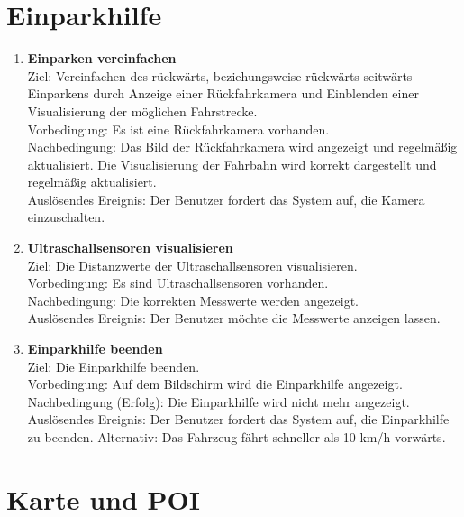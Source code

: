 \documentclass[pflichtenheft.tex]{subfiles}
\begin{document}
	\section{Einparkhilfe}
	
	\begin{enumerate}
	\setcounter{enumi}{\value{enumTemp}}

	\item{\textbf{Einparken vereinfachen}} \\ Ziel: Vereinfachen des rückwärts, beziehungsweise rückwärts-seitwärts Einparkens durch Anzeige einer Rückfahrkamera und Einblenden einer Visualisierung der möglichen Fahrstrecke. \\
	Vorbedingung: Es ist eine Rückfahrkamera vorhanden. \\ Nachbedingung: Das Bild der Rückfahrkamera wird angezeigt und regelmäßig aktualisiert. Die Visualisierung der Fahrbahn wird korrekt dargestellt und regelmäßig aktualisiert.\\
	Auslösendes Ereignis: Der Benutzer fordert das System auf, die Kamera einzuschalten. 

	\item{\textbf{Ultraschallsensoren visualisieren}} \label{ultrasound} \\ Ziel: Die Distanzwerte der Ultraschallsensoren visualisieren. 		\\ Vorbedingung: Es sind Ultraschallsensoren vorhanden.\\
	Nachbedingung: Die korrekten Messwerte werden angezeigt.\\
	Auslösendes Ereignis: Der Benutzer möchte die Messwerte anzeigen lassen.

	\item{\textbf{Einparkhilfe beenden}} \label{quit:passist} \\ Ziel: Die Einparkhilfe beenden. \\ Vorbedingung: Auf dem Bildschirm wird die Einparkhilfe angezeigt. \\ Nachbedingung (Erfolg): Die Einparkhilfe wird nicht mehr angezeigt.\\
	Auslösendes Ereignis: Der Benutzer fordert das System auf, die Einparkhilfe zu beenden. Alternativ: Das Fahrzeug fährt schneller als 10 km/h vorwärts.

	\setcounter{enumTemp}{\value{enumi}}

	\end{enumerate}
	
	
	\section{Karte und POI}
	
\end{document}
